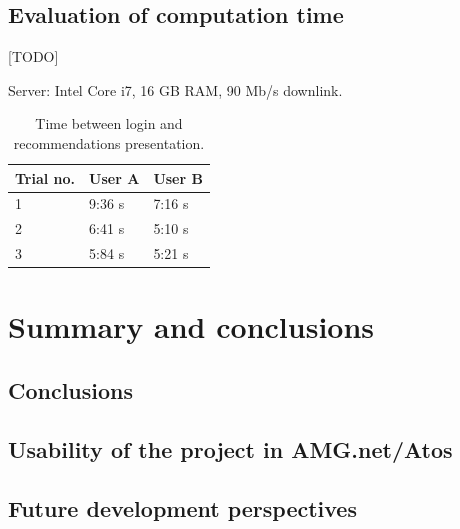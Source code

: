 \documentclass[12pt]{report}
\begin{document}


\section{Evaluation of computation time}

[TODO]

Server: Intel Core i7, 16 GB RAM, 90 Mb/s downlink.

\begin{table}[h]
\centering
\caption{Time between login and recommendations presentation.}
\label{table.eval.time1}
\vspace{3mm}
\begin{tabular}{|l|l|l|}
\hline
Trial no. & User A & User B \\ \hline
1         & 9:36 s & 7:16 s \\ \hline
2         & 6:41 s & 5:10 s \\ \hline
3         & 5:84 s & 5:21 s \\ \hline
\end{tabular}
\end{table}




\chapter{Summary and conclusions}
\label{ch.summary}
\section{Conclusions}
\section{Usability of the project in AMG.net/Atos}
\section{Future development perspectives}
\end{document}
